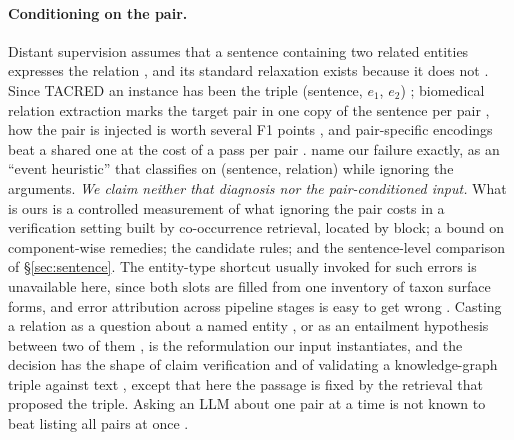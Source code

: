 \documentclass[11pt]{article}
\begin{document}
\paragraph{Conditioning on the pair.}
Distant supervision assumes that a sentence containing two related entities expresses the relation
\citep{mintz2009distant}, and its standard relaxation exists because it does not
\citep{riedel2010modeling}. Since TACRED an instance has been the triple (sentence, $e_1$, $e_2$)
\citep{zhang2017position}; biomedical relation extraction marks the target pair in one copy of the
sentence per pair \citep{lee2020biobert}, how the pair is injected is worth several F1 points
\citep{soares2019matching,wu2019enriching,zhou2022improved}, and pair-specific encodings beat a
shared one at the cost of a pass per pair \citep{zhong2021frustratingly}.
\citet{rosenman2020exposing} name our failure exactly, as an ``event heuristic'' that classifies on
(sentence, relation) while ignoring the arguments. \emph{We claim neither that diagnosis nor the
pair-conditioned input.} What is ours is a controlled measurement of what ignoring the pair costs
in a verification setting built by co-occurrence retrieval, located by block; a bound on
component-wise remedies; the candidate rules; and the sentence-level comparison of
\S\ref{sec:sentence}. The entity-type shortcut usually invoked for such errors
\citep{peng2020learning,mtumbuka2024entity} is unavailable here, since both slots are filled from
one inventory of taxon surface forms, and error attribution across pipeline stages is easy to get
wrong \citep{taille-etal-2020-lets,ai2023endtoend}. Casting a relation as a question about a named
entity \citep{levy2017zero}, or as an entailment hypothesis between two of them
\citep{obamuyide2018zero,sainz2021label}, is the reformulation our input instantiates, and the decision has the shape of claim verification \citep{wadden2020fact} and of
validating a knowledge-graph triple against text \citep{lehmann2012defacto}, except that here the
passage is fixed by the retrieval that proposed the triple. Asking an LLM about one pair at a time
is not known to beat listing all pairs at once \citep{mraz2026fewshot}. 
\end{document}
